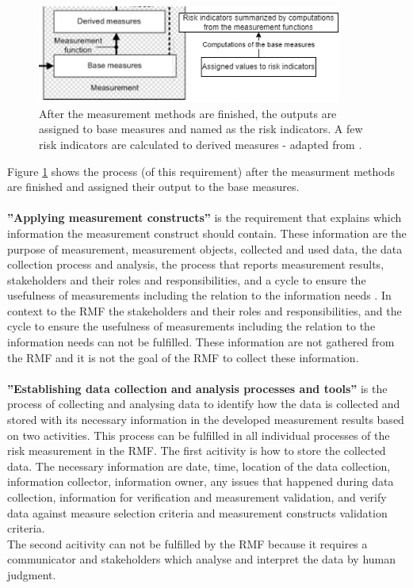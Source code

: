 \begin{figure}[ht!]
  \centering
  \includegraphics[width=10cm]{pictures/base_to_derived_measure.png}
  \caption{After the measurement methods are finished, the outputs are assigned to base measures and named as the risk indicators. A few risk indicators are calculated to derived measures - adapted from \cite{ISO_27004_2009}.}
  \label{fig:base_to_derived_measure}
\end{figure}

Figure \ref{fig:base_to_derived_measure} shows the process (of this requirement) after the measurment methods are finished and assigned their output to the base measures.\\ \\

\textbf{''Applying measurement constructs''} is the requirement that explains which information the measurement construct should contain. These information are the purpose of measurement, measurement objects, collected and used data, the data collection process and analysis, the process that reports measurement results, stakeholders and their roles and responsibilities, and a cycle to ensure the usefulness of measurements including the relation to the information needs \cite{ISO_27004_2009}. In context to the RMF the stakeholders and their roles and responsibilities, and the cycle to ensure the usefulness of measurements including the relation to the information needs can not be fulfilled. These information are not gathered from the RMF and it is not the goal of the RMF to collect these information. \\ \\

\textbf{''Establishing data collection and analysis processes and tools''} is the process of collecting and analysing data to identify how the data is collected and stored with its necessary information in the developed measurement results based on two activities. This process can be fulfilled in all individual processes of the risk measurement in the RMF. The first acitivity is how to store the collected data. The necessary information are date, time, location of the data collection, information collector, information owner, any issues that happened during data collection, information for verification and measurement validation, and verify data against measure selection criteria and measurement constructs validation criteria. \\ The second acitivity can not be fulfilled by the RMF because it requires a communicator and stakeholders which analyse and interpret the data by human judgment. \\ \\

